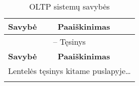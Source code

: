 \documentclass[12pt,a4paper,titlepage]{article}
\begin{document}
\begin{longtable}{|p{3cm}|p{9.8cm}|}
\caption{OLTP sistemų savybės\cite{UPI07} \label{table:oltpsavybes}}\\

\hline \hline
{\textbf{Savybė}} &
{\textbf{Paaiškinimas}}\\
\hline
\endfirsthead


\multicolumn{2}{c}{{\tablename} \thetable{} -- Tęsinys} \\[0.5ex]
\hline \hline
{\textbf{Savybė}} &
{\textbf{Paaiškinimas}}\\
\hline
\endhead


\multicolumn{2}{l}{{Lentelės tęsinys kitame puslapyje\ldots}} \\
\endfoot



\end{longtable}
\end{document}

